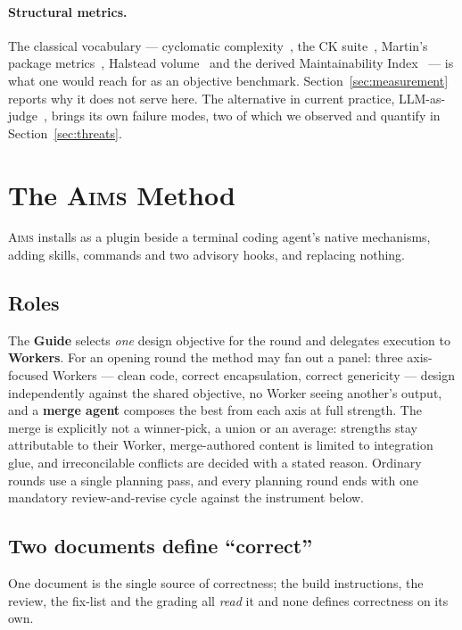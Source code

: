 \documentclass[11pt]{article}
\newcommand{\aims}{\textsc{Aims}}
\begin{document}
\paragraph{Structural metrics.} The classical vocabulary --- cyclomatic complexity~\cite{mccabe1976complexity}, the CK suite~\cite{chidamber1994metrics}, Martin's package metrics~\cite{martin2003agile}, Halstead volume~\cite{halstead1977elements} and the derived Maintainability Index~\cite{coleman1994using} --- is what one would reach for as an objective benchmark. Section~\ref{sec:measurement} reports why it does not serve here. The alternative in current practice, LLM-as-judge~\cite{zheng2023judging}, brings its own failure modes, two of which we observed and quantify in Section~\ref{sec:threats}.

\section{The \aims{} Method}
\label{sec:method}

\aims{} installs as a plugin beside a terminal coding agent's native mechanisms, adding skills, commands and two advisory hooks, and replacing nothing.

\subsection{Roles}
The \textbf{Guide} selects \emph{one} design objective for the round and delegates execution to \textbf{Workers}. For an opening round the method may fan out a panel: three axis-focused Workers --- clean code, correct encapsulation, correct genericity --- design independently against the shared objective, no Worker seeing another's output, and a \textbf{merge agent} composes the best from each axis at full strength. The merge is explicitly not a winner-pick, a union or an average: strengths stay attributable to their Worker, merge-authored content is limited to integration glue, and irreconcilable conflicts are decided with a stated reason. Ordinary rounds use a single planning pass, and every planning round ends with one mandatory review-and-revise cycle against the instrument below.

\subsection{Two documents define ``correct''}
\label{sec:principles}
One document is the single source of correctness; the build instructions, the review, the fix-list and the grading all \emph{read} it and none defines correctness on its own.
\end{document}
